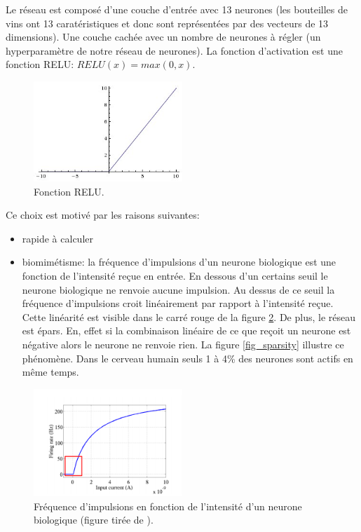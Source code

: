 \documentclass[a4paper,11pt,oneside,roman]{article}
\begin{document}
    Le réseau est composé d'une couche d'entrée avec 13 neurones (les bouteilles de vins ont 13 caratéristiques et donc sont représentées par des vecteurs de 13 dimensions).
    Une couche cachée avec un nombre de neurones à régler (un hyperparamètre de notre réseau de neurones). 
    La fonction d'activation est une fonction RELU: $RELU(x) = max(0,x)$. 
    
    \begin{figure}
        \centering
        \includegraphics[width=0.5\textwidth]{imgs/RELU.jpg}
        \caption{Fonction RELU.}
        \label{fig_relu}
    \end{figure}
    
    Ce choix est motivé par les raisons suivantes:
    \begin{itemize}
        \item rapide à calculer
        \item biomimétisme: la fréquence d'impulsions d'un neurone biologique est une fonction de l'intensité reçue en entrée. 
        En dessous d'un certains seuil le neurone biologique ne renvoie aucune impulsion.
        Au dessus de ce seuil la fréquence d'impulsions croit linéairement par rapport à l'intensité reçue. Cette linéarité est visible dans le carré rouge de la figure \ref{fig_firing_rate}.
        De plus, le réseau est épars. En, effet si la combinaison linéaire de ce que reçoit un neurone est négative alors le neurone ne renvoie rien.
        La figure \ref{fig_sparsity} illustre ce phénomène. Dans le cerveau humain seuls 1 à 4\% des neurones sont actifs en même temps.
        
    \end{itemize}

    \begin{figure}
        \centering
        \includegraphics[width=0.5\textwidth]{imgs/firing_rate.png}
        \caption{Fréquence d'impulsions en fonction de l'intensité d'un neurone biologique (figure tirée de \cite{pmlr-v15-glorot11a}).}
        \label{fig_firing_rate}
    \end{figure}
\end{document}
